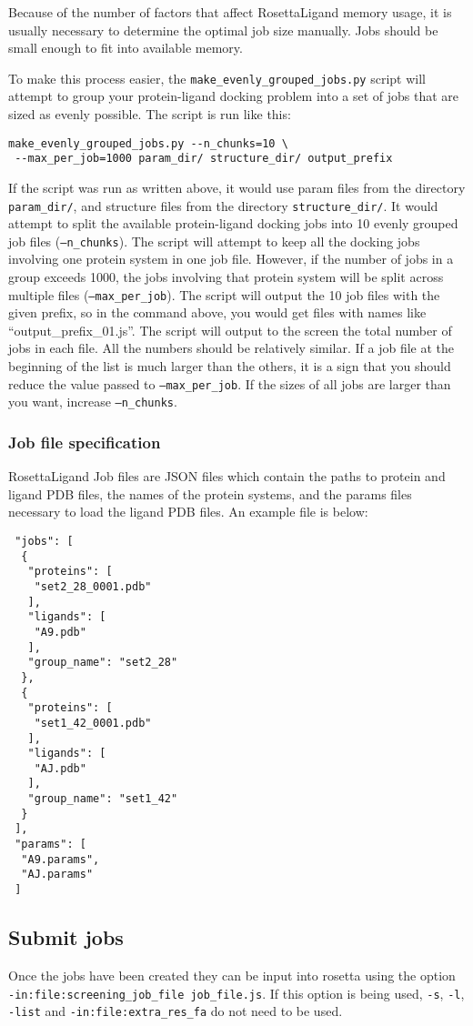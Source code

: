 Because of the number of factors that affect RosettaLigand memory usage, it is usually necessary to determine the optimal job size manually.
Jobs should be small enough to fit into available memory.

To make this process easier, the \texttt{make\_evenly\_grouped\_jobs.py} script will attempt to group your protein-ligand docking problem into a set of jobs that are sized as evenly possible. 
The script is run like this:

\singlespace
\begin{verbatim}
make_evenly_grouped_jobs.py --n_chunks=10 \
 --max_per_job=1000 param_dir/ structure_dir/ output_prefix
\end{verbatim}
\doublespace

If the script was run as written above, it would use param files from the directory \texttt{param\_dir/}, and structure files from the directory \texttt{structure\_dir/}.
It would attempt to split the available protein-ligand docking jobs into 10 evenly grouped job files (\texttt{--n\_chunks}).
The script will attempt to keep all the docking jobs involving one protein system in one job file. However, if the number of jobs in a group exceeds 1000,
the jobs involving that protein system will be split across multiple files (\texttt{--max\_per\_job}). 
The script will output the 10 job files with the given prefix, so in the command above, you would get files with names like ``output\_prefix\_01.js''.
The script will output to the screen the total number of jobs in each file. All the numbers should be relatively similar. 
If a job file at the beginning of the list is much larger than the others, it is a sign that you should reduce the value passed to \texttt{--max\_per\_job}. If the sizes of all jobs are larger than you want, increase \texttt{--n\_chunks}.

\subsubsection{Job file specification}

RosettaLigand Job files are \ac{JSON} files which contain the paths to protein and ligand \ac{PDB} files, the names of the protein systems,
and the params files necessary to load the ligand \ac{PDB} files.
An example file is below:

\singlespace
\begin{verbatim}
 "jobs": [
  {
   "proteins": [
    "set2_28_0001.pdb"
   ],
   "ligands": [
    "A9.pdb"
   ],
   "group_name": "set2_28"
  },
  {
   "proteins": [
    "set1_42_0001.pdb"
   ],
   "ligands": [
    "AJ.pdb"
   ],
   "group_name": "set1_42"
  }
 ],
 "params": [
  "A9.params",
  "AJ.params"
 ]
\end{verbatim}
\doublespace

\subsection{Submit jobs}

Once the jobs have been created they can be input into rosetta using the option\\
\texttt{-in:file:screening\_job\_file job\_file.js}.
If this option is being used, \texttt{-s}, \texttt{-l}, \texttt{-list} and \texttt{-in:file:extra\_res\_fa} do not need to be used.
